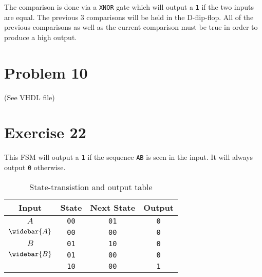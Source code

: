 \documentclass[11pt]{article}
\def\code#1{\texttt{#1}}
\begin{document}
The comparison is done via a \code{XNOR} gate which will output a \code{1} if the 
two inputs are equal. The previous 3 comparisons will be held in the D-flip-flop.
All of the previous comparisons as well as the current comparison must be true
in order to produce a high output.

\section*{Problem 10}
(See VHDL file)

\pagebreak
\section*{Exercise 22}
This FSM will output a \code{1} if the sequence \code{AB} is seen in the input.
It will always output \code{0} otherwise.


\begin{table}[H]
    \renewcommand{\arraystretch}{1.2}
    \caption{State-transistion and output table}
    \begin{center}
        \begin{tabular}{|c|c|c|c|}
            \hline
            Input & State & Next State & Output\\\hline
            \hline
            $A$ & \code{00} & \code{01} & \code{0}\\\hline
            $\widebar{A}$ & \code{00} & \code{00} & \code{0}\\\Xhline{4\arrayrulewidth}
            
            $B$ & \code{01} & \code{10} & \code{0}\\\hline
            $\widebar{B}$ & \code{01} & \code{00} & \code{0}\\\Xhline{4\arrayrulewidth}
            
             & \code{10} & \code{00} & \code{1}\\\hline
        \end{tabular}
    \end{center}
    \label{tab:decode}
\end{table}
\end{document}
